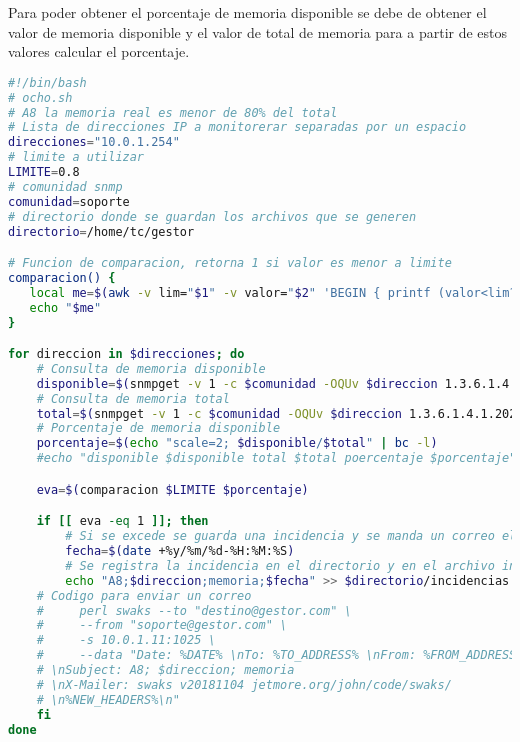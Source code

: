 \documentclass[a4paper,12pt]{article}
\begin{document}
Para poder obtener el porcentaje de memoria disponible se debe de obtener el valor de memoria disponible y el valor de total de memoria para a partir de estos valores calcular el porcentaje.
\begin{lstlisting}[language=bash]
 #!/bin/bash
# ocho.sh
# A8 la memoria real es menor de 80% del total
# Lista de direcciones IP a monitorerar separadas por un espacio
direcciones="10.0.1.254"
# limite a utilizar
LIMITE=0.8
# comunidad snmp
comunidad=soporte
# directorio donde se guardan los archivos que se generen
directorio=/home/tc/gestor

# Funcion de comparacion, retorna 1 si valor es menor a limite
comparacion() {
   local me=$(awk -v lim="$1" -v valor="$2" 'BEGIN { printf (valor<lim?1:0) }')
   echo "$me"
}

for direccion in $direcciones; do
    # Consulta de memoria disponible
    disponible=$(snmpget -v 1 -c $comunidad -OQUv $direccion 1.3.6.1.4.1.2021.4.6.0)
    # Consulta de memoria total
    total=$(snmpget -v 1 -c $comunidad -OQUv $direccion 1.3.6.1.4.1.2021.4.5.0)
    # Porcentaje de memoria disponible
    porcentaje=$(echo "scale=2; $disponible/$total" | bc -l)
    #echo "disponible $disponible total $total poercentaje $porcentaje"

    eva=$(comparacion $LIMITE $porcentaje)

    if [[ eva -eq 1 ]]; then
        # Si se excede se guarda una incidencia y se manda un correo electronico
        fecha=$(date +%y/%m/%d-%H:%M:%S)
        # Se registra la incidencia en el directorio y en el archivo incidencias
        echo "A8;$direccion;memoria;$fecha" >> $directorio/incidencias.log
    # Codigo para enviar un correo
    #     perl swaks --to "destino@gestor.com" \
    #     --from "soporte@gestor.com" \
    #     -s 10.0.1.11:1025 \
    #     --data "Date: %DATE% \nTo: %TO_ADDRESS% \nFrom: %FROM_ADDRESS% 
    # \nSubject: A8; $direccion; memoria 
    # \nX-Mailer: swaks v20181104 jetmore.org/john/code/swaks/
    # \n%NEW_HEADERS%\n"
    fi
done

\end{lstlisting}
\end{document}

